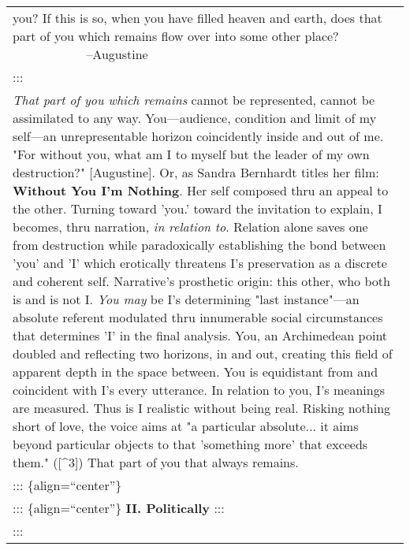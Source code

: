\begin{longtable}[]{@{}l@{}}
\begin{minipage}[t]{0.97\columnwidth}
{you? If this is so, when you \textbar{} have filled heaven and earth,
does that part of you which remains \textbar{} flow over into some other
place?} \textbar{} \textbar{} ~~~~~~~~~~ ~--Augustine\strut
\end{minipage}\tabularnewline
\begin{minipage}[t]{0.97\columnwidth}\raggedright
:::\strut
\end{minipage}\tabularnewline
\begin{minipage}[t]{0.97\columnwidth}\raggedright
\emph{That part of you which remains} cannot be represented, cannot be
assimilated to any way. You---audience, condition and limit of my
self---an unrepresentable horizon coincidently inside and out of me.
"For without you, what am I to myself but the leader of my own
destruction?" {[}Augustine{]}. Or, as Sandra Bernhardt titles her film:
\textbf{Without You I'm Nothing}. Her self composed thru an appeal to
the other. Turning toward 'you.' toward the invitation to explain, I
becomes, thru narration, \emph{in relation to}. Relation alone saves one
from destruction while paradoxically establishing the bond between 'you'
and 'I' which erotically threatens I's preservation as a discrete and
coherent self. Narrative's prosthetic origin: this other, who both is
and is not I. \emph{You may} be I's determining "last instance"---an
absolute referent modulated thru innumerable social circumstances that
determines 'I' in the final analysis. You, an Archimedean point doubled
and reflecting two horizons, in and out, creating this field of apparent
depth in the space between. You is equidistant from and coincident with
I's every utterance. In relation to you, I's meanings are measured. Thus
is I realistic without being real. Risking nothing short of love, the
voice aims at "a particular absolute... it aims beyond particular
objects to that 'something more' that exceeds them." ({[}\^{}3{]}) That
part of you that always remains.\strut
\end{minipage}\tabularnewline
\begin{minipage}[t]{0.97\columnwidth}\raggedright
::: \{align=``center''\}\strut
\end{minipage}\tabularnewline
\begin{minipage}[t]{0.97\columnwidth}\raggedright
\textbar{} ::: \{align=``center''\} \textbar{} \textbf{II. Politically}
\textbar{} :::\strut
\end{minipage}\tabularnewline
\begin{minipage}[t]{0.97\columnwidth}\raggedright
:::\strut
\end{minipage}\tabularnewline

\end{longtable}
